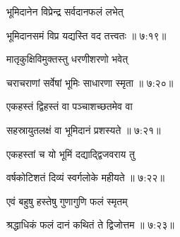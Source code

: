 {\devanagarifont भूमिदानेन विप्रेन्द्र सर्वदानफलं लभेत् \thinspace{\dandab} \dontdisplaylinenum }%


{\devanagarifont भूमिदानसमं विप्र यद्यस्ति वद तत्त्वतः {॥ ७:१९॥} \veg\dontdisplaylinenum }%
 
{\devanagarifont मातृकुक्षिविमुक्तस्तु धरणीशरणो भवेत् \thinspace{\dandab} \dontdisplaylinenum }%


{\devanagarifont चराचराणां सर्वेषां भूमिः साधारणा स्मृता {॥ ७:२०॥} \veg\dontdisplaylinenum }%
 
{\devanagarifont एकहस्तं द्विहस्तं वा पञ्चाशच्छतमेव वा \thinspace{\dandab} \dontdisplaylinenum }%


{\devanagarifont सहस्रायुतलक्षं वा भूमिदानं प्रशस्यते {॥ ७:२१॥} \veg\dontdisplaylinenum }%

{\devanagarifont एकहस्तां च यो भूमिं दद्याद्द्विजवराय तु \thinspace{\dandab} \dontdisplaylinenum }%


{\devanagarifont वर्षकोटिशतं दिव्यं स्वर्गलोके महीयते {॥ ७:२२॥} \veg\dontdisplaylinenum }%
 
{\devanagarifont एवं बहुषु हस्तेषु गुणागुणि फलं स्मृतम् \thinspace{\dandab} \dontdisplaylinenum }%


{\devanagarifont श्रद्धाधिकं फलं दानं कथितं ते द्विजोत्तम {॥ ७:२३॥} \veg\dontdisplaylinenum }%


